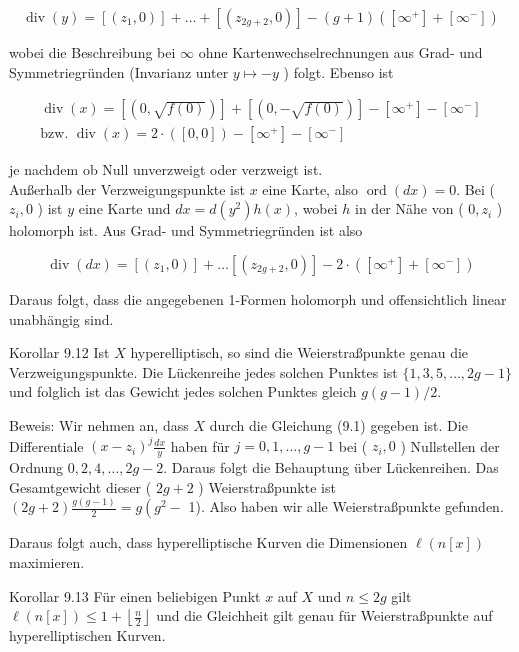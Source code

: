 \documentclass[10pt, letterpaper]{article}
\begin{document}
$$
\operatorname{div}(y)=\left[\left(z_{1}, 0\right)\right]+\ldots+\left[\left(z_{2 g+2}, 0\right)\right]-(g+1)\left(\left[\infty^{+}\right]+\left[\infty^{-}\right]\right)
$$

wobei die Beschreibung bei $\infty$ ohne Kartenwechselrechnungen aus Grad- und Symmetriegründen (Invarianz unter $y \longmapsto-y$ ) folgt. Ebenso ist

$$
\begin{gathered}
\operatorname{div}(x)=[(0, \sqrt{f(0)})]+[(0,-\sqrt{f(0)})]-\left[\infty^{+}\right]-\left[\infty^{-}\right] \\
\text {bzw. } \operatorname{div}(x)=2 \cdot([0,0])-\left[\infty^{+}\right]-\left[\infty^{-}\right]
\end{gathered}
$$

je nachdem ob Null unverzweigt oder verzweigt ist.\\
Außerhalb der Verzweigungspunkte ist $x$ eine Karte, also $\operatorname{ord}(d x)=0$. Bei ( $z_{i}, 0$ ) ist $y$ eine Karte und $d x=d\left(y^{2}\right) h(x)$, wobei $h$ in der Nähe von ( $0, z_{i}$ ) holomorph ist. Aus Grad- und Symmetriegründen ist also

$$
\operatorname{div}(d x)=\left[\left(z_{1}, 0\right)\right]+\ldots\left[\left(z_{2 g+2}, 0\right)\right]-2 \cdot\left(\left[\infty^{+}\right]+\left[\infty^{-}\right]\right)
$$

Daraus folgt, dass die angegebenen 1-Formen holomorph und offensichtlich linear unabhängig sind.

Korollar 9.12 Ist $X$ hyperelliptisch, so sind die Weierstraßpunkte genau die Verzweigungspunkte. Die Lückenreihe jedes solchen Punktes ist $\{1,3,5, \ldots, 2 g-1\}$ und folglich ist das Gewicht jedes solchen Punktes gleich $g(g-1) / 2$.

Beweis: Wir nehmen an, dass $X$ durch die Gleichung (9.1) gegeben ist. Die Differentiale $\left(x-z_{i}\right)^{j} \frac{d x}{y}$ haben für $j=0,1, \ldots, g-1$ bei ( $z_{i}, 0$ ) Nullstellen der Ordnung $0,2,4, \ldots, 2 g-2$. Daraus folgt die Behauptung über Lückenreihen. Das Gesamtgewicht dieser ( $2 g+2$ ) Weierstraßpunkte ist $(2 g+2) \frac{g(g-1)}{2}=g\left(g^{2}-\right.$ 1). Also haben wir alle Weierstraßpunkte gefunden.

Daraus folgt auch, dass hyperelliptische Kurven die Dimensionen $\ell(n[x])$ maximieren.

Korollar 9.13 Für einen beliebigen Punkt $x$ auf $X$ und $n \leq 2 g$ gilt $\ell(n[x]) \leq 1+ \left\lfloor\frac{n}{2}\right\rfloor$ und die Gleichheit gilt genau für Weierstraßpunkte auf hyperelliptischen Kurven.
\end{document}

